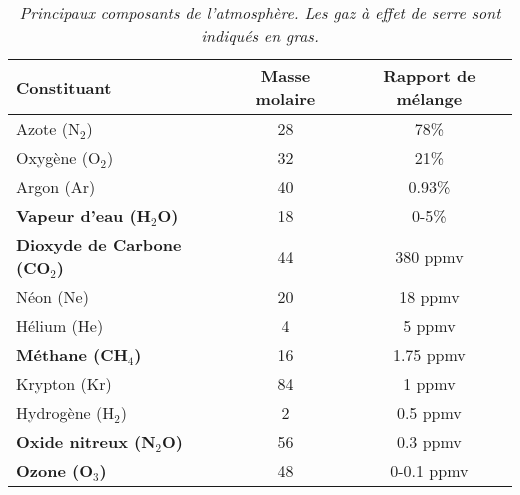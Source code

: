 \begin{table}
\centering
\begin{tabular}{lcc}
\hline
\textbf{Constituant} &
\textbf{Masse molaire} &
\textbf{Rapport de mélange} \\
\hline
Azote (N$_2$) & 28 & 78\% \\
Oxygène (O$_2$) & 32 & 21\% \\
Argon (Ar) & 40 & 0.93\% \\
\textbf{Vapeur d'eau (H$_2$O)} & 18 & 0-5\% \\
\textbf{Dioxyde de Carbone (CO$_2$)} & 44 & 380 ppmv \\
Néon (Ne) & 20 & 18 ppmv \\
Hélium (He) & 4 & 5 ppmv \\
\textbf{Méthane (CH$_4$)} & 16 & 1.75 ppmv \\
Krypton (Kr) & 84 & 1 ppmv \\
Hydrogène (H$_2$) & 2 & 0.5 ppmv \\
\textbf{Oxide nitreux (N$_2$O)} & 56 & 0.3 ppmv \\
\textbf{Ozone (O$_3$)} & 48 & 0-0.1 ppmv \\
\hline
\end{tabular}
\caption{\emph{Principaux composants de l'atmosphère. Les gaz à effet de serre sont indiqués en gras.}}
\label{tab:compos}
\end{table}
